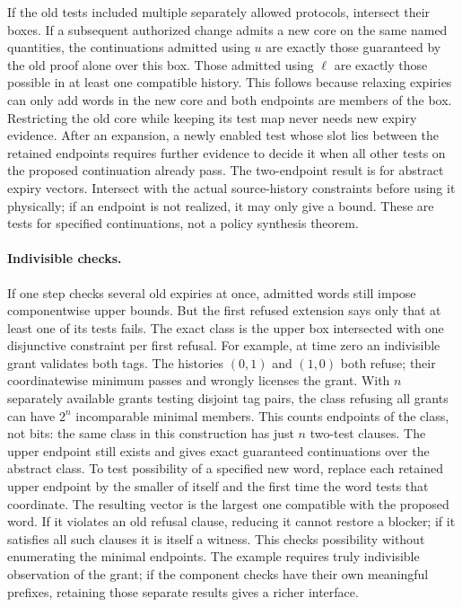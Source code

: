 \documentclass{article}
\begin{document}
If the old tests included multiple separately allowed protocols, intersect their boxes. If a subsequent authorized change admits a new core on the same named quantities, the continuations admitted using \(u\) are exactly those guaranteed by the old proof alone over this box. Those admitted using \(\ell\) are exactly those possible in at least one compatible history. This follows because relaxing expiries can only add words in the new core and both endpoints are members of the box. Restricting the old core while keeping its test map never needs new expiry evidence. After an expansion, a newly enabled test whose slot lies between the retained endpoints requires further evidence to decide it when all other tests on the proposed continuation already pass. The two-endpoint result is for abstract expiry vectors. Intersect with the actual source-history constraints before using it physically; if an endpoint is not realized, it may only give a bound. These are tests for specified continuations, not a policy synthesis theorem.

\paragraph{Indivisible checks.}
If one step checks several old expiries at once, admitted words still impose componentwise upper bounds. But the first refused extension says only that at least one of its tests fails. The exact class is the upper box intersected with one disjunctive constraint per first refusal. For example, at time zero an indivisible grant validates both tags. The histories \((0,1)\) and \((1,0)\) both refuse; their coordinatewise minimum passes and wrongly licenses the grant. With \(n\) separately available grants testing disjoint tag pairs, the class refusing all grants can have \(2^n\) incomparable minimal members. This counts endpoints of the class, not bits: the same class in this construction has just \(n\) two-test clauses. The upper endpoint still exists and gives exact guaranteed continuations over the abstract class. To test possibility of a specified new word, replace each retained upper endpoint by the smaller of itself and the first time the word tests that coordinate. The resulting vector is the largest one compatible with the proposed word. If it violates an old refusal clause, reducing it cannot restore a blocker; if it satisfies all such clauses it is itself a witness. This checks possibility without enumerating the minimal endpoints. The example requires truly indivisible observation of the grant; if the component checks have their own meaningful prefixes, retaining those separate results gives a richer interface.
\end{document}
